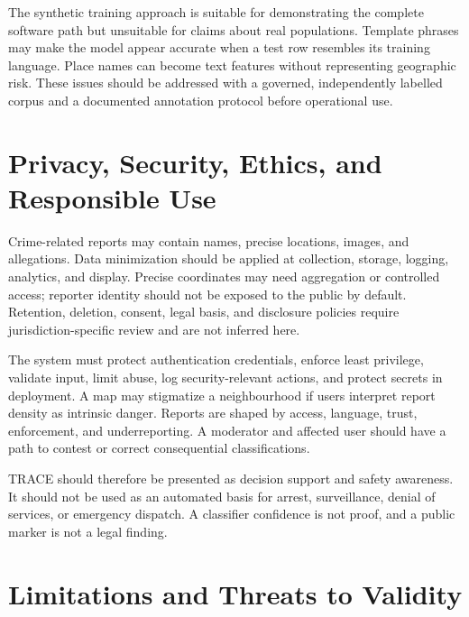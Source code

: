 \documentclass[11pt]{article}
\begin{document}
The synthetic training approach is suitable for demonstrating the complete
software path but unsuitable for claims about real populations. Template
phrases may make the model appear accurate when a test row resembles its
training language. Place names can become text features without representing
geographic risk. These issues should be addressed with a governed,
independently labelled corpus and a documented annotation protocol before
operational use.

\section{Privacy, Security, Ethics, and Responsible Use}
\label{sec:ethics}

Crime-related reports may contain names, precise locations, images, and
allegations. Data minimization should be applied at collection, storage,
logging, analytics, and display. Precise coordinates may need aggregation
or controlled access; reporter identity should not be exposed to the
public by default. Retention, deletion, consent, legal basis, and disclosure
policies require jurisdiction-specific review and are not inferred here.

The system must protect authentication credentials, enforce least privilege,
validate input, limit abuse, log security-relevant actions, and protect
secrets in deployment. A map may stigmatize a neighbourhood if users
interpret report density as intrinsic danger. Reports are shaped by access,
language, trust, enforcement, and underreporting. A moderator and affected
user should have a path to contest or correct consequential classifications.

TRACE should therefore be presented as decision support and safety
awareness. It should not be used as an automated basis for arrest,
surveillance, denial of services, or emergency dispatch. A classifier
confidence is not proof, and a public marker is not a legal finding.

\section{Limitations and Threats to Validity}
\label{sec:limitations}
\end{document}
